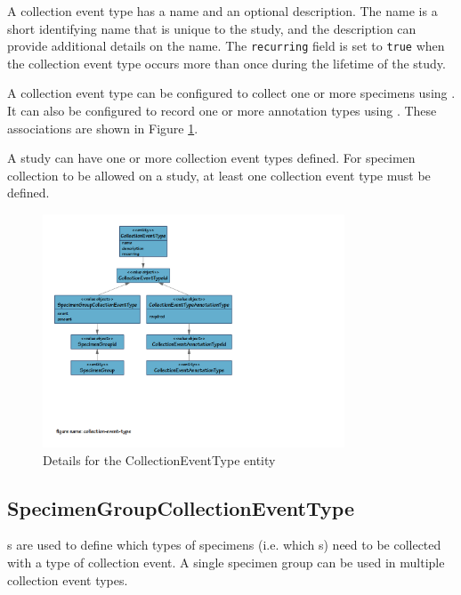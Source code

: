 A collection event type has a name and an optional description. The name is a
short identifying name that is unique to the study, and the description can
provide additional details on the name. The \texttt{recurring} field is set to
\texttt{true} when the collection event type occurs more than once during the
lifetime of the study.

A collection event type can be configured to collect one or more specimens using
. It can also be configured to
record one or more annotation types using
. These associations are shown in
Figure \ref{fig:collection-event-type}.

A study can have one or more collection event types defined. For specimen
collection to be allowed on a study, at least one collection event type must be
defined.

\begin{figure}[H]
  \centering
  \includegraphics[trim={9mm 65mm 96mm 9mm}, clip,
    width=0.8\textwidth]{images/collection-event-type}
  \caption{Details for the CollectionEventType entity}
  \label{fig:collection-event-type}
\end{figure}

\subsection*{SpecimenGroupCollectionEventType}

s are used to define which types
of specimens (i.e. which s) need to be collected with
a type of collection event. A single specimen group can be used in multiple
collection event types.

